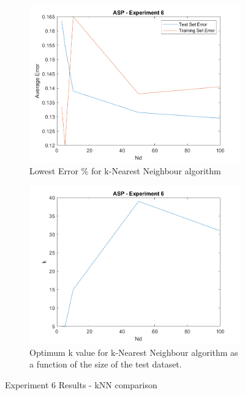 \begin{figure}[h]
	\centering
	\begin{subfigure}{.5\textwidth}
		\centering
		\includegraphics[width=.95\linewidth]{./code/Exp6-results/ErrorComparison.png}
		\caption{Lowest Error \% for k-Nearest Neighbour algorithm}
	\end{subfigure}%
	\begin{subfigure}{.5\textwidth}
		\centering
		\includegraphics[width=.95\linewidth]{./code/Exp6-results/BestkVals.png}
		\caption{Optimum k value for k-Nearest Neighbour algorithm as a function of the size of the test dataset.}
	\end{subfigure}
	\caption{Experiment 6 Results - kNN comparison}
	\label{fig:Exp6}
\end{figure}

